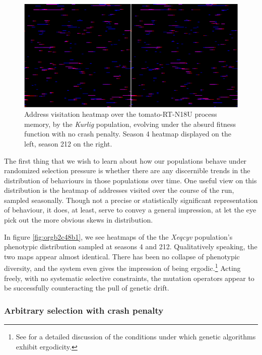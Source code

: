 \documentclass[12pt,glossary]{dalthesis}
\begin{document}
\begin{figure}[htbp]
\centering
\includegraphics[width=.9\linewidth]{../images/plots/kurlig_heatmap_4_212_montage.pdf}
\caption{\label{fig:org15926a3}
Address visitation heatmap over the tomato-RT-N18U process memory, by the \emph{Kurlig} population, evolving under the absurd fitness function with no crash penalty. Season 4 heatmap displayed on the left, season 212 on the right.}
\end{figure}


The first thing that we wish to learn about how our populations behave under
randomized selection pressure is whether there are any discernible 
trends in the distribution of behaviours in those populations over time. 
One useful view on this distribution is the heatmap of addresses visited over the
course of the run, sampled seasonally. Though not a precise or statistically
significant representation of behaviour, it does, at least, serve to convey a
general impression, at let the eye pick out the more obvious skews in distribution. 

In figure \ref{fig:orgb2c48b1}, we see heatmaps of the the \emph{Xeqcyv} population's
phenotypic distribution sampled at seasons 4 and 212. Qualitatively speaking, the
two maps appear almost identical. There has been no collapse of phenotypic diversity,
and the system even gives the impression of being ergodic.\footnote{See \cite{schmitt01} for a detailed discussion of the conditions under which genetic algorithms exhibit ergodicity.} Acting freely, with
no systematic selective constraints, the mutation operators appear to be successfully
counteracting the pull of genetic drift. 


\subsubsection{Arbitrary selection with crash penalty}
\label{sec:orgef8230f}
\label{orge60d7cf}
\end{document}
